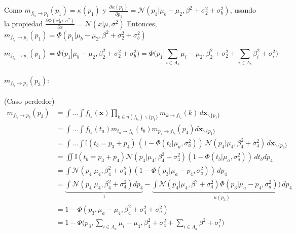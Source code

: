 \documentclass[11pt,twoside,spanish]{report} %
\begin{document}
Como $m_{f_{t_a} \rightarrow p_1}(p_1) = \kappa(p_1)$ y $\frac{\partial\kappa(p_1)}{\partial p_1}=  \mathcal{N}(p_1| \mu_{b} - \mu_{2}, \beta^2+\sigma_2^2 + \sigma_{b}^2)$, usando la propiedad $\frac{\partial\Phi(x| \mu, \sigma^2)}{\partial x}=\mathcal{N}(x| \mu, \sigma^2)$ Entonces, $m_{f_{t_a} \rightarrow p_1}(p_1) = \Phi(p_1| \mu_b - \mu_2, \beta^2 + \sigma_2^2 + \sigma_b^2)$

\begin{equation}
	m_{f_{t_a} \rightarrow p_1}(p_1) =  \Phi(p_1| \mu_b - \mu_2, \beta_2^2 + \sigma_2^2 + \sigma_b^2) =  \Phi\Big(p_1| \sum_{i \in A_b} \mu_i - \mu_2, \beta_2^2 + \sigma_2^2 + \sum_{i \in A_b} \beta_i^2 + \sigma_i^2 \Big)
\end{equation}


\paragraph{$m_{f_{t_b} \rightarrow p_3}(p_3):$} (Caso perdedor)
\begin{equation}
	\begin{split}
		m_{f_{t_b} \rightarrow p_3}(p_3)&= \int \dots \int f_{t_a}(\textbf{x}) \prod_{k \in n(f_{t_a}) \backslash \{p_1\} } m_{k \rightarrow f_{t_a}}(k) \, d\textbf{x}_{\backslash \{p_1\} }  \\
		&= \int \dots \int f_{t_a}(t_a) m_{t_b\rightarrow f_{t_b}}(t_b) m_{p_4 \rightarrow f_{t_b}}(p_4)d\textbf{x}_{\backslash \{p_1\} }  \\
		&= \int \dots \int \mathbb{I}( t_b = p_3 + p_4) \, (1-\Phi (t_b| \mu_a , \sigma_a^2 )) \, \mathcal{N}(p_4| \mu_4, \beta_4^2 + \sigma_4^2 ) \, d\textbf{x}_{\backslash \{p_3\} }\\
		&= \iint \mathbb{I}( t_b = p_3 + p_4) \mathcal{N}(p_4| \mu_4, \beta_4^2 + \sigma_4^2 )  (1 - \Phi (t_b| \mu_a , \sigma_a^2) )\, dt_b dp_4 \\
		&=\int \mathcal{N}(p_4| \mu_4, \beta_4^2 + \sigma_4^2 )  (1 - \Phi (p_3 | \mu_a - p_4 , \sigma_a^2 ) ) \,  dp_4 \\
		& =  \underbrace{\int \mathcal{N}(p_4| \mu_4, \beta_4^2 + \sigma_4^2 )dp_4}_{1}  -  \underbrace{\int \mathcal{N}(p_4| \mu_4, \beta^2 + \sigma_4^2 ) \Phi (p_3 | \mu_a - p_4 , \sigma_a^2 ) ) \, dp_4}_{\kappa(p_3)} \\
		& = 1 - \Phi(p_3, \mu_a  - \mu_4, \beta_4^2 + \sigma_4^2 + \sigma_a^2)\\[0.1cm]
		&=1 - \Phi\Big(p_3, \sum_{i \in A_a} \mu_i  - \mu_4, \beta_4^2 + \sigma_4^2 + \sum_{i \in A_a} \beta^2 + \sigma_i^2  \Big)
	\end{split}
\end{equation}
\end{document}
